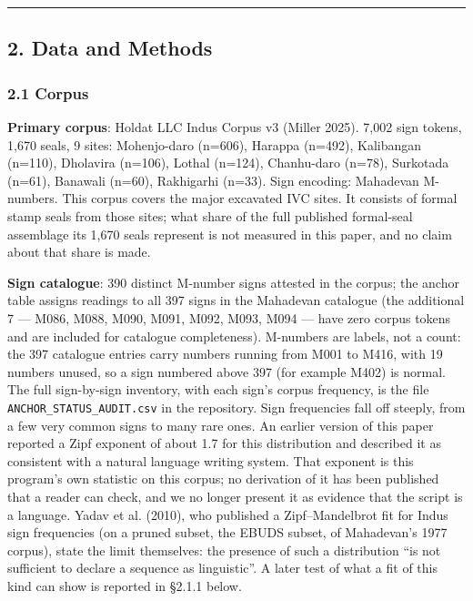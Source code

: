 \documentclass[
]{article}
\begin{document}
\begin{center}\rule{0.5\linewidth}{0.5pt}\end{center}

\subsection{2. Data and Methods}\label{data-and-methods}

\subsubsection{2.1 Corpus}\label{corpus}

\textbf{Primary corpus}: Holdat LLC Indus Corpus v3 (Miller 2025). 7,002
sign tokens, 1,670 seals, 9 sites: Mohenjo-daro (n=606), Harappa
(n=492), Kalibangan (n=110), Dholavira (n=106), Lothal (n=124),
Chanhu-daro (n=78), Surkotada (n=61), Banawali (n=60), Rakhigarhi
(n=33). Sign encoding: Mahadevan M-numbers. This corpus covers the major excavated IVC sites. It consists of formal stamp seals from those sites; what share of the full published formal-seal assemblage its 1,670 seals represent is not measured in this paper, and no claim about that share is made.

\textbf{Sign catalogue}: 390 distinct M-number signs attested in the corpus; the anchor table assigns readings to all 397 signs in the Mahadevan catalogue (the additional 7 --- M086, M088, M090, M091, M092, M093, M094 --- have zero corpus tokens and are included for catalogue completeness). M-numbers are labels, not a count: the 397 catalogue entries carry numbers running from M001 to M416, with 19 numbers unused, so a sign numbered above 397 (for example M402) is normal. The full sign-by-sign inventory, with each sign's corpus frequency, is the file \texttt{ANCHOR\_STATUS\_AUDIT.csv} in the repository. Sign frequencies fall off steeply, from a few very common signs to many rare ones. An earlier version of this paper reported a Zipf exponent of about 1.7 for this distribution and described it as consistent with a natural language writing system. That exponent is this program's own statistic on this corpus; no derivation of it has been published that a reader can check, and we no longer present it as evidence that the script is a language. Yadav et al. (2010), who published a Zipf--Mandelbrot fit for Indus sign frequencies (on a pruned subset, the EBUDS subset, of Mahadevan's 1977 corpus), state the limit themselves: the presence of such a distribution ``is not sufficient to declare a sequence as linguistic''. A later test of what a fit of this kind can show is reported in §2.1.1 below.
\end{document}
